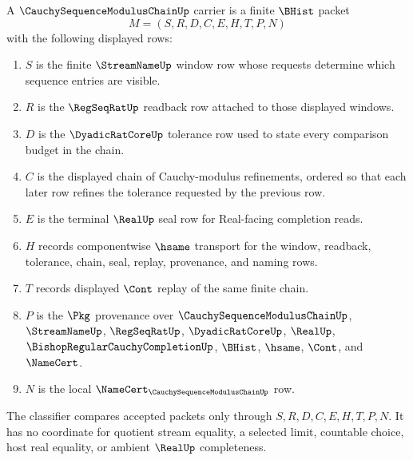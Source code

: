 \begin{definition}
\label{def:cauchy-sequence-modulus-chain-carrier}
A $\CauchySequenceModulusChainUp$ carrier is a finite $\BHist$ packet
$$
M=(S,R,D,C,E,H,T,P,N)
$$
with the following displayed rows:
\begin{enumerate}
\item $S$ is the finite $\StreamNameUp$ window row whose requests determine which sequence entries are visible.
\item $R$ is the $\RegSeqRatUp$ readback row attached to those displayed windows.
\item $D$ is the $\DyadicRatCoreUp$ tolerance row used to state every comparison budget in the chain.
\item $C$ is the displayed chain of Cauchy-modulus refinements, ordered so that each later row refines the tolerance requested by the previous row.
\item $E$ is the terminal $\RealUp$ seal row for Real-facing completion reads.
\item $H$ records componentwise $\hsame$ transport for the window, readback, tolerance, chain, seal, replay, provenance, and naming rows.
\item $T$ records displayed $\Cont$ replay of the same finite chain.
\item $P$ is the $\Pkg$ provenance over $\CauchySequenceModulusChainUp$, $\StreamNameUp$, $\RegSeqRatUp$, $\DyadicRatCoreUp$, $\RealUp$, $\BishopRegularCauchyCompletionUp$, $\BHist$, $\hsame$, $\Cont$, and $\NameCert$.
\item $N$ is the local $\NameCert_{\CauchySequenceModulusChainUp}$ row.
\end{enumerate}
The classifier compares accepted packets only through $S,R,D,C,E,H,T,P,N$. It has no coordinate for quotient stream equality, a selected limit, countable choice, host real equality, or ambient $\RealUp$ completeness.
\end{definition}

